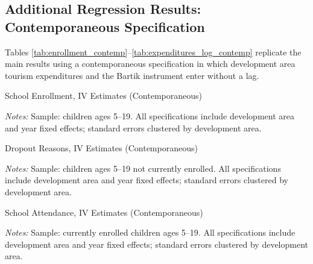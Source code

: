 \documentclass[12pt]{article}
\newcommand*{\TableContempPath}{../Paper_3_Tables/Main_Regression_Tables}
\begin{document}
	\FloatBarrier

	\subsection{Additional Regression Results: Contemporaneous Specification}
	\label{subsec:app_contemp}

	Tables \ref{tab:enrollment_contemp}--\ref{tab:expenditures_log_contemp} replicate the main results using a contemporaneous specification in which development area tourism expenditures and the Bartik instrument enter without a lag.

	\begin{table}[H]
	\centering
	\begin{adjustbox}{max width=\linewidth, center}
	\begin{threeparttable}
		\caption{School Enrollment, IV Estimates (Contemporaneous)}
		\label{tab:enrollment_contemp}
		{\small}
		\begin{tablenotes}
			\small
			\item \textit{Notes:} Sample: children ages 5--19. All specifications include development area and year fixed effects; standard errors clustered by development area.
		\end{tablenotes}
	\end{threeparttable}
	\end{adjustbox}
	\end{table}
	\begin{table}[H]
	\centering
	\begin{adjustbox}{max width=\linewidth, center}
	\begin{threeparttable}
		\caption{Dropout Reasons, IV Estimates (Contemporaneous)}
		\label{tab:dropout_reasons_contemp}
		{\small}
		\begin{tablenotes}
			\small
			\item \textit{Notes:} Sample: children ages 5--19 not currently enrolled. All specifications include development area and year fixed effects; standard errors clustered by development area.
		\end{tablenotes}
	\end{threeparttable}
	\end{adjustbox}
	\end{table}
	\begin{table}[H]
	\centering
	\begin{adjustbox}{max width=\linewidth, center}
	\begin{threeparttable}
		\caption{School Attendance, IV Estimates (Contemporaneous)}
		\label{tab:attendance_levels_contemp}
		{\small}
		\begin{tablenotes}
			\small
			\item \textit{Notes:} Sample: currently enrolled children ages 5--19. All specifications include development area and year fixed effects; standard errors clustered by development area.
		\end{tablenotes}
	\end{threeparttable}
	\end{adjustbox}
	\end{table}
\end{document}
